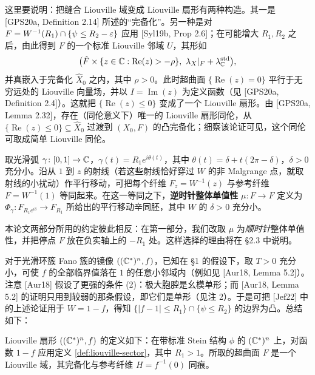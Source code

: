 这里要说明：把缝合 Liouville 域变成 Liouville 扇形有两种构造。其一是 [GPS20a, Definition 2.14] 所述的“完备化”。另一种是对 $F=W^{-1}(R_1)\cap\{\psi\le R_2-\varepsilon\}$ 应用 [Syl19b, Prop 2.6]；在可能增大 $R_1,R_2$ 之后，由此得到 $F$ 的一个标准 Liouville 邻域 $U$，其形如
\[
\bigl(\hat F\times\{z\in\C:\operatorname{Re}(z)>-\rho\},\ \lambda_X|_F+\lambda_{\C}^{\mathrm{std}}\bigr),
\]
并真嵌入于完备化 $\hat X_0$ 之内，其中 $\rho>0$。此时超曲面 $\{\operatorname{Re}(z)=0\}$ 平行于无穷远处的 Liouville 向量场，并以 $I=\operatorname{Im}(z)$ 为定义函数（见 [GPS20a, Definition
2.4]）。这就把 $\{\operatorname{Re}(z)\le0\}$ 变成了一个 Liouville 扇形。由 [GPS20a, Lemma 2.32]，存在（同伦意义下）唯一的 Liouville 扇形同伦，从 $\{\operatorname{Re}(z)\le0\}\subseteq\hat X_0$ 过渡到 $(X_0,F)$ 的凸完备化；细察该论证可见，这个同伦可取成简单 Liouville 同伦。

取光滑弧 $\gamma\colon[0,1]\to\mathbb{C}$，$\gamma(t)=R_1e^{i\theta(t)}$，其中 $\theta(t)=\delta+t(2\pi-\delta)$，$\delta>0$ 充分小。沿从 $1$ 到 $z$ 的射线（若这些射线恰好穿过 $W$ 的非 Malgrange 点，就取射线的小扰动）作平行移动，可把每个纤维 $F_z=W^{-1}(z)$ 与参考纤维 $F=W^{-1}(1)$ 等同起来。在这一等同之下，\textbf{逆时针整体单值性} $\mu\colon F\to F$ 定义为 $\Phi_\gamma\colon F_{R_1e^{i\delta}}\to F_{R_1}$ 所给出的平行移动辛同胚，其中 $W$ 的 $\delta>0$ 充分小。

\begin{remarkx}\label{rem:5}
本论文两部分所用的约定彼此相反：在第一部分，我们改取 $\mu$ 为\emph{顺时针}整体单值性，并把停点 $F$ 放在负实轴上的 $-R_1$ 处。这样选择的理由将在 §2.3 中说明。
\end{remarkx}

对于光滑环簇 Fano 簇的镜像 $((\mathbb{C}^*)^n,f)$，已知在 §1 的假设下，取 $T>0$ 充分小，可使 $f$ 的全部临界值落在 $1$ 的任意小邻域内（例如见 [Aur18, Lemma 5.2]）。注意 [Aur18] 假设了更强的条件 (2)：极大胞腔是幺模单形；而 [Aur18, Lemma 5.2] 的证明只用到较弱的那条假设，即它们是单形（见注 2）。于是可把 [Jef22] 中的上述论证用于 $W=1-f$，得知 $\{|f-1|\le R_1\}\cap\{\psi\le R_2\}$ 的边界为凸。总结如下：

\begin{definition}\label{def:toric-lg-sector}\label{def:2-1-10}
Liouville 扇形 $((\mathbb{C}^*)^n,f)$ 的定义如下：在带标准 Stein 结构 $\phi$ 的 $(\mathbb{C}^*)^n$ 上，对函数 $1-f$ 应用定义 \ref{def:liouville-sector}，其中 $R_1>1$。所取的超曲面 $F$ 是一个 Liouville 域，其完备化与参考纤维 $H=f^{-1}(0)$ 同痕。
\end{definition}

